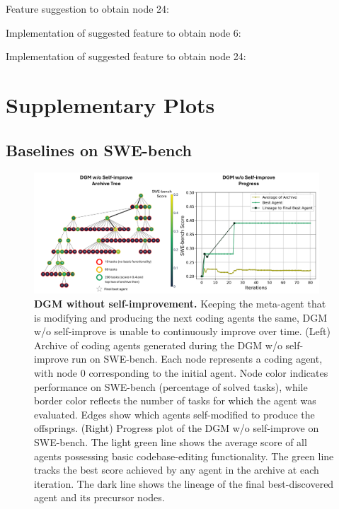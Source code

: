 \documentclass{article}
\begin{document}
Feature suggestion to obtain node 24:


Implementation of suggested feature to obtain node 6:


Implementation of suggested feature to obtain node 24:


\section{Supplementary Plots}

\subsection{Baselines on SWE-bench}
\label{app:plots-swe}

\begin{figure}[H]
    \centering
    \includegraphics[width=0.95\textwidth]{figures/dgm_wo_selfimprove.pdf}
    \caption{\textbf{DGM without self-improvement.} Keeping the meta-agent that is modifying and producing the next coding agents the same, DGM w/o self-improve is unable to continuously improve over time. (Left) Archive of coding agents generated during the DGM w/o self-improve run on SWE-bench. Each node represents a coding agent, with node 0 corresponding to the initial agent. Node color indicates performance on SWE-bench (percentage of solved tasks), while border color reflects the number of tasks for which the agent was evaluated. Edges show which agents self-modified to produce the offsprings. (Right) Progress plot of the DGM w/o self-improve on SWE-bench. The light green line shows the average score of all agents possessing basic codebase-editing functionality. The green line tracks the best score achieved by any agent in the archive at each iteration. The dark line shows the lineage of the final best-discovered agent and its precursor nodes.}
    \label{fig:dgm-no-selfimprove}
\end{figure}
\end{document}
